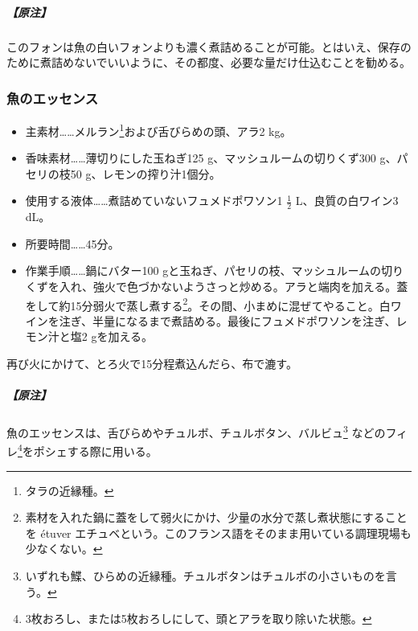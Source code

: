 \begin{recette}
\hypertarget{nota-fonds-de-poisson-au-vin-rouge}{%
\subparagraph{【原注】}\label{nota-fonds-de-poisson-au-vin-rouge}}

このフォンは魚の白いフォンよりも濃く煮詰めることが可能。とはいえ、保存のために煮詰めないでいいように、その都度、必要な量だけ仕込むことを勧める。

\atoaki{}

\hypertarget{essence-de-poisson}{%
\subsubsection{魚のエッセンス}\label{essence-de-poisson}}



\begin{itemize}
\item
  主素材\ldots{}\ldots{}メルラン\footnote{タラの近縁種。}および舌びらめの頭、アラ2
  kg。
\item
  香味素材\ldots{}\ldots{}薄切りにした玉ねぎ125
  g、マッシュルームの切りくず300 g、パセリの枝50
  g、レモンの搾り汁1個分。
\item
  使用する液体\ldots{}\ldots{}煮詰めていないフュメドポワソン1
  \(\frac{1}{2}\) L、良質の白ワイン3 dL。
\item
  所要時間\ldots{}\ldots{}45分。
\item
  作業手順\ldots{}\ldots{}鍋にバター100
  gと玉ねぎ、パセリの枝、マッシュルームの切りくずを入れ、強火で色づかないようさっと炒める。アラと端肉を加える。蓋をして約15分弱火で蒸し煮する\footnote{素材を入れた鍋に蓋をして弱火にかけ、少量の水分で蒸し煮状態にすることを
    étuver
    エチュベという。このフランス語をそのまま用いている調理現場も少なくない。}。その間、小まめに混ぜてやること。白ワインを注ぎ、半量になるまで煮詰める。最後にフュメドポワソンを注ぎ、レモン汁と塩2
  gを加える。
\end{itemize}

再び火にかけて、とろ火で15分程煮込んだら、布で漉す。

\hypertarget{nota-essence-de-poisson}{%
\subparagraph{【原注】}\label{nota-essence-de-poisson}}

魚のエッセンスは、舌びらめやチュルボ、チュルボタン、バルビュ\footnote{いずれも鰈、ひらめの近縁種。チュルボタンはチュルボの小さいものを言う。}
などのフィレ\footnote{3枚おろし、または5枚おろしにして、頭とアラを取り除いた状態。}をポシェする際に用いる。


\end{recette}
